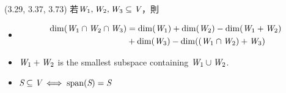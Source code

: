 \item \begin{theorem}{(3.29, 3.37, 3.73)} 若$\textit{W}_1, \textit{W}_2, \textit{W}_3 \subseteq \textit{V}$，則 \begin{itemize}
		\item \begin{equation}
			\begin{aligned}
				\dim(\textit{W}_1 \cap \textit{W}_2 \cap \textit{W}_3) 
				& = \dim(\textit{W}_1) + \dim(\textit{W}_2) - \dim(\textit{W}_1 + \textit{W}_2) \\
				& + \dim(\textit{W}_3) - \dim((\textit{W}_1 \cap \textit{W}_2) + \textit{W}_3) 
			\end{aligned}
		\end{equation}
		\item $\textit{W}_1 + \textit{W}_2$ is the smallest subspace containing $\textit{W}_1 \cup \textit{W}_2$.
		\item $\textit{S} \subseteq \textit{V} \iff \operatorname{span}(\textit{S}) = \textit{S}$
	\end{itemize}
\end{theorem}
